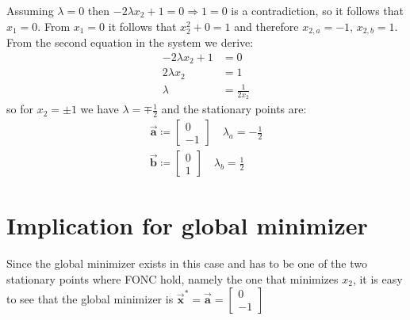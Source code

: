 \documentclass[oneside, a4paper]{book}
\newcommand\vek[1]{\vec{\bm{#1}}}
\begin{document}
Assuming $\lambda=0$ then $-2\lambda x_2 + 1 = 0 \Longrightarrow 1 = 0$ is a contradiction, so it follows that $x_1=0$. From $x_1=0$ it follows that $x_2^2 + 0 = 1$ and therefore $x_{2,a} = -1,\,x_{2,b}=1$. From the second equation in the system we derive:
\begin{align*}
  -2\lambda x_2 +1 &= 0\\
  2\lambda x_2 &= 1\\
  \lambda &= \frac{1}{2x_2}
\end{align*}
so for $x_2 = \pm 1$ we have $\lambda = \mp \frac{1}{2}$ and the stationary points are:
\begin{align*}
  \vek{a}\coloneq \begin{bmatrix}0\\-1\end{bmatrix}  \quad \lambda_a=-\frac{1}{2}\\
  \vek{b}\coloneq \begin{bmatrix}0\\1\end{bmatrix}  \quad \lambda_b=\frac{1}{2}
\end{align*}

\section{Implication for global minimizer}
Since the global minimizer exists in this case and has to be one of the two stationary points where FONC hold, namely the one that minimizes $x_2$, it is easy to see that the global minimizer is $\vek{x}^* = \vek{a} = \begin{bmatrix}0\\-1\end{bmatrix}$
\end{document}
